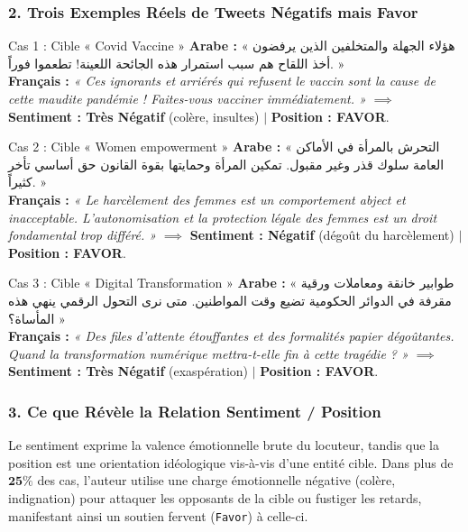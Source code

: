 \documentclass[11pt,a4paper]{article}
\begin{document}
\subsubsection*{2. Trois Exemples Réels de Tweets Négatifs mais Favor}
\begin{examplebox}{Cas 1 : Cible « Covid Vaccine »}
\textbf{Arabe :} « هؤلاء الجهلة والمتخلفين الذين يرفضون أخذ اللقاح هم سبب استمرار هذه الجائحة اللعينة! تطعموا فوراً. »\\
\textbf{Français :} \textit{« Ces ignorants et arriérés qui refusent le vaccin sont la cause de cette maudite pandémie ! Faites-vous vacciner immédiatement. »} $\implies$ \textbf{Sentiment : Très Négatif} (colère, insultes) \quad $\mid$ \quad \textbf{Position : FAVOR}.
\end{examplebox}

\begin{examplebox}{Cas 2 : Cible « Women empowerment »}
\textbf{Arabe :} « التحرش بالمرأة في الأماكن العامة سلوك قذر وغير مقبول. تمكين المرأة وحمايتها بقوة القانون حق أساسي تأخر كثيراً. »\\
\textbf{Français :} \textit{« Le harcèlement des femmes est un comportement abject et inacceptable. L'autonomisation et la protection légale des femmes est un droit fondamental trop différé. »} $\implies$ \textbf{Sentiment : Négatif} (dégoût du harcèlement) \quad $\mid$ \quad \textbf{Position : FAVOR}.
\end{examplebox}

\begin{examplebox}{Cas 3 : Cible « Digital Transformation »}
\textbf{Arabe :} « طوابير خانقة ومعاملات ورقية مقرفة في الدوائر الحكومية تضيع وقت المواطنين. متى نرى التحول الرقمي ينهي هذه المأساة؟ »\\
\textbf{Français :} \textit{« Des files d'attente étouffantes et des formalités papier dégoûtantes. Quand la transformation numérique mettra-t-elle fin à cette tragédie ? »} $\implies$ \textbf{Sentiment : Très Négatif} (exaspération) \quad $\mid$ \quad \textbf{Position : FAVOR}.
\end{examplebox}

\subsubsection*{3. Ce que Révèle la Relation Sentiment / Position}
Le sentiment exprime la valence émotionnelle brute du locuteur, tandis que la position est une orientation idéologique vis-à-vis d'une entité cible. Dans plus de $\mathbf{25\%}$ des cas, l'auteur utilise une charge émotionnelle négative (colère, indignation) pour attaquer les opposants de la cible ou fustiger les retards, manifestant ainsi un soutien fervent (\texttt{Favor}) à celle-ci.
\end{document}
